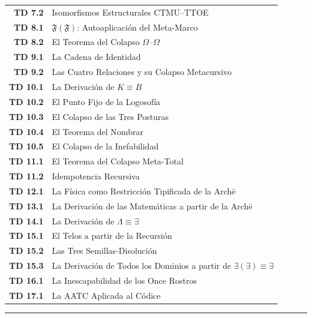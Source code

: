 \documentclass[10pt, openany, oneside]{book}
\begin{document}
{\begin{tabular}{r p{}}
\textbf{TD 7.2} & Isomorfismos Estructurales CTMU--TTOE \\[0.2em]
\textbf{TD 8.1} & $\mathfrak{F}(\mathfrak{F})$: Autoaplicación del Meta-Marco \\[0.2em]
\textbf{TD 8.2} & El Teorema del Colapso $\Omega$--$\Omega$ \\[0.2em]
\textbf{TD 9.1} & La Cadena de Identidad \\[0.2em]
\textbf{TD 9.2} & Las Cuatro Relaciones y su Colapso Metacursivo \\[0.2em]
\textbf{TD 10.1} & La Derivación de $K \equiv B$ \\[0.2em]
\textbf{TD 10.2} & El Punto Fijo de la Logosofía \\[0.2em]
\textbf{TD 10.3} & El Colapso de las Tres Posturas \\[0.2em]
\textbf{TD 10.4} & El Teorema del Nombrar \\[0.2em]
\textbf{TD 10.5} & El Colapso de la Inefabilidad \\[0.2em]
\textbf{TD 11.1} & El Teorema del Colapso Meta-Total \\[0.2em]
\textbf{TD 11.2} & Idempotencia Recursiva \\[0.2em]
\textbf{TD 12.1} & La Física como Restricción Tipificada de la Arch\={e} \\[0.2em]
\textbf{TD 13.1} & La Derivación de las Matemáticas a partir de la Arch\={e} \\[0.2em]
\textbf{TD 14.1} & La Derivación de $\Lambda \equiv \exists$ \\[0.2em]
\textbf{TD 15.1} & El Telos a partir de la Recursión \\[0.2em]
\textbf{TD 15.2} & Las Tres Semillas-Disolución \\[0.2em]
\textbf{TD 15.3} & La Derivación de Todos los Dominios a partir de $\exists(\exists) \equiv \exists$ \\[0.2em]
\textbf{TD 16.1} & La Inescapabilidad de los Once Rostros \\[0.2em]
\textbf{TD 17.1} & La AATC Aplicada al Códice \\[0.2em]
\end{tabular}
}

\vspace{2em}

\begin{center}
    \rule{0.15\textwidth}{0.3pt}
\end{center}

\vspace{0.5em}
\end{document}
